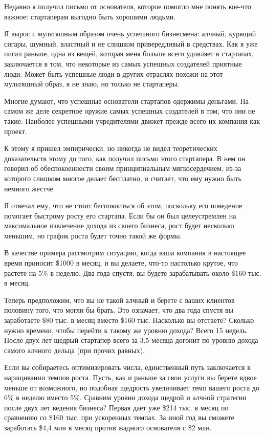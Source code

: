 \documentclass[ebook,12pt,oneside,openany]{memoir}
\author{Пол Грэм} \date{}
\begin{document}
\maketitle

Недавно я получил письмо от основателя, которое помогло мне понять
кое-что важное: стартаперам выгодно быть хорошими людьми.

Я вырос с мультяшным образом очень успешного бизнесмена: алчный,
курящий сигары, шумный, властный и не слишком привередливый в
средствах. Как я уже писал раньше, одна из вещей, которая меня больше
всего удивляет в стартапах, заключается в том, что некоторые из самых
успешных создателей приятные люди. Может быть успешные люди в других
отраслях похожи на этот мультяшный образ, я не знаю, но только не
стартаперы.

Многие думают, что успешные основатели стартапов одержимы деньгами. На
самом же деле секретное оружие самых успешных создателей в том, что
они не такие. Наиболее успешными учредителями движет прежде всего их
компания как проект.

К этому я пришел эмпирически, но никогда не видел теоретических
доказательств этому до того, как получил письмо этого стартапера. В
нем он говорил об обеспокоенности своим принципиальным мягкосердечием,
из-за которого слишком многое делает бесплатно, и считает, что ему
нужно быть немного жестче.

Я отвечал ему, что не стоит беспокоиться об этом, поскольку его
поведение помогает быстрому росту его стартапа. Если бы он был
целеустремлен на максимальное извлечение дохода из своего бизнеса,
рост будет несколько меньшим, но график роста будет точно такой же
формы.

В качестве примера рассмотрим ситуацию, когда ваша компания в
настоящее время приносит \$1000 в месяц, и вы делаете, что-то
настолько крутое, что растете на 5\% в неделю. Два года спустя, вы
будете зарабатывать около \$160 тыс. в месяц.

Теперь предположим, что вы не такой алчный и берете с ваших клиентов
половину того, что могли бы брать. Это означает, что два года спустя
вы заработаете \$80 тыс. в месяц вместо \$160 тыс. Насколько вы
отстаете? Сколько нужно времени, чтобы перейти к такому же уровню
дохода? Всего 15 недель. После двух лет щедрый стартапер всего за 3,5
месяца догонит по уровню дохода самого алчного дельца (при прочих
равных).

Если вы собираетесь оптимизировать числа, единственный путь
заключается в наращивании темпов роста. Пусть, как и раньше за свои
услуги вы берете вдвое меньше от возможного, но подобная щедрость
увеличивает темп вашего роста до 6\% в неделю вместо 5\%. Сравним
уровни дохода щедрой и алчной стратегии после двух лет ведения
бизнеса? Первая дает уже \$214 тыс. в месяц по сравнению со \$160 тыс.
при ускоренных темпах. За иной год вы сможете заработать \$4,4 млн в
месяц против жадного основателя с \$2 млн.
\end{document}
